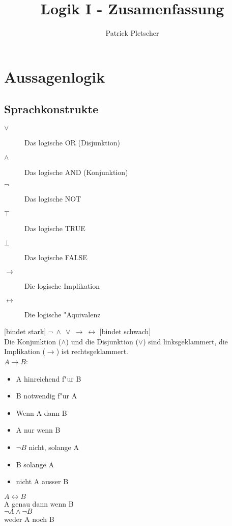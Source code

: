 \documentclass[11pt, a4paper,twocolumn]{scrartcl}
\title{Logik I - Zusamenfassung}
\author{Patrick Pletscher}
\begin{document}
\maketitle

\section{Aussagenlogik}

\subsection{Sprachkonstrukte}
\begin{description}
 \item[$\lor$] Das logische OR (Disjunktion)
 \item[$\land$] Das logische AND (Konjunktion)
 \item[$\lnot$] Das logische NOT
 \item[$\top$] Das logische TRUE
 \item[$\bot$] Das logische FALSE
 \item[$\rightarrow$] Die logische Implikation
 \item[$\leftrightarrow$] Die logische "Aquivalenz
\end{description}

[bindet stark] $\lnot\:\land\:\lor\:\rightarrow\:\leftrightarrow$ [bindet schwach]\\
Die Konjunktion ($\land$) und die Disjunktion ($\lor$) sind linksgeklammert, die Implikation ($\rightarrow$) ist rechtsgeklammert.\\

$A\rightarrow B$:
\begin{itemize}
 \item A hinreichend f"ur B
 \item B notwendig f"ur A
 \item Wenn A dann B
 \item A nur wenn B
 \item $\lnot B$ nicht, solange A
 \item B solange A
 \item nicht A ausser B
\end{itemize}

$A\leftrightarrow B$\\
A genau dann wenn B\\

$\lnot A\land\lnot B$\\
weder A noch B
\end{document}
